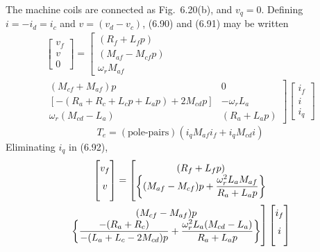 \documentclass[a4paper,numbers=noenddot,12pt]{scrbook}
\begin{document}
The machine coils are connected as Fig.\ 6.20(b), and $v_q = 0$. Defining $i = -i_d = i_c$ and $v = (v_d - v_c)$, (6.90) and (6.91) may be written
\begin{multline}
    \begin{bmatrix}
        v_f \\ v \\ 0
    \end{bmatrix}
    =
    \left[
        \begin{matrix}
            (R_f + L_f p) \\
            (M_{af} - M_{cf} p) \\
            \omega_r M_{af}
        \end{matrix}
        \right.\\
        \left.
        \begin{matrix}
            (M_{cf} + M_{af}) p & 0 \\
            [-(R_a + R_c + L_c p + L_a p) + 2 M_{cd}p] & -\omega_r L_a \\
            \omega_r(M_{cd} - L_a) & (R_a + L_a p)
        \end{matrix}
    \right]
    \begin{bmatrix}
        i_f \\i \\i_q
    \end{bmatrix}
\end{multline}
\begin{equation}
    T_e = (\text{pole-pairs})(i_q M_{af} i_f + i_q M_{cd} i)
    \label{eq:Eq6.93}
\end{equation}
Eliminating $i_q$ in (6.92),
\begin{multline}
    \begin{bmatrix}
        v_f \\  v \vphantom{\bigg\{\dfrac{M^2}{R_a}\bigg\}} 
    \end{bmatrix}
    =
    \left[
        \begin{matrix}
            (R_f + L_f p) \\ 
            \bigg\{(M_{af} - M_{cf})p + \dfrac{\omega_r^2 L_a M_{af}}{R_a + L_a p}\bigg\}
        \end{matrix}
        \right . \\
        \left .
        \begin{matrix}
            (M_{cf} - M_{af})p \\
            \bigg\{\dfrac{-(R_a + R_c)}{-(L_a + L_c -2 M_{cd})p} + \dfrac{\omega_r^2 L_a (M_{cd} - L_a)}{R_a + L_a p}\bigg\}
        \end{matrix}
    \right]
    \begin{bmatrix}
        i_f \\ i \vphantom{\bigg\{\dfrac{M^2}{R_a}\bigg\}} 
    \end{bmatrix}
\end{multline}
\end{document}
